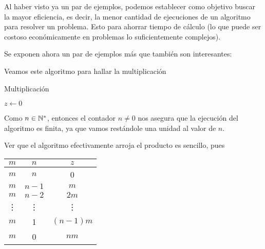 Al haber visto ya un par de ejemplos, podemos establecer como objetivo buscar la mayor eficiencia, es decir, la menor cantidad de ejecuciones de un algoritmo para resolver un problema. Esto para ahorrar tiempo de cálculo (lo que puede ser costoso económicamente en problemas lo suficientemente complejos).

Se exponen ahora un par de ejemplos más que también son interesantes:

\begin{ejem}
    Veamos este algoritmo para hallar la multiplicación
    
    \begin{algoritmo}
    \caption{Multiplicación}\label{alg:mult}
    $z \leftarrow 0$ \\
    \end{algoritmo}
    
    Como $n \in \mathbb{N}^*$, entonces el contador $n \neq 0$ nos asegura que la ejecución del algoritmo es finita, ya que vamos restándole una unidad al valor de $n$.
    
    Ver que el algoritmo efectivamente arroja el producto es sencillo, pues
    
    \begin{center}
        \begin{tabular}{c|c|c}
              $m$  &  $n$   & $z$      \\ \toprule
              $m$  &  $n$   & 0        \\
              $m$  & $n-1$  & $m$      \\
              $m$  & $n-2$  & $2m$     \\
            \vdots & \vdots & \vdots   \\
              $m$  &   1    & $(n-1)m$ \\ 
              $m$  &   0    & $nm$
        \end{tabular}
    \end{center}
\end{ejem}

